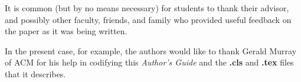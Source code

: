 \documentclass{sig-alternate}
\begin{document}
It is common (but by no means necessary) for students to thank
their advisor, and possibly other faculty, friends, and family who provided
useful feedback on the paper as it was being written.

In the present case, for example, the
authors would like to thank Gerald Murray of ACM for
his help in codifying this \textit{Author's Guide}
and the \textbf{.cls} and \textbf{.tex} files that it describes.


  
\end{document}
